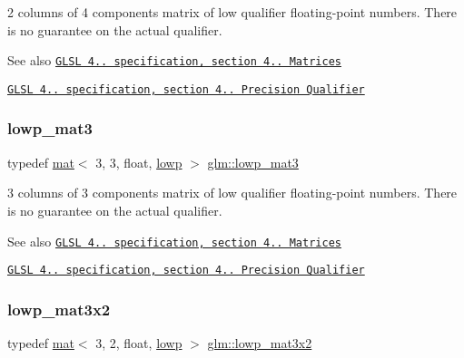 2 columns of 4 components matrix of low qualifier floating-\/point numbers. There is no guarantee on the actual qualifier.

\begin{DoxySeeAlso}{See also}
\href{http://www.opengl.org/registry/doc/GLSLangSpec.4.20.8.pdf}{\tt G\+L\+SL 4.. specification, section 4.. Matrices} 

\href{http://www.opengl.org/registry/doc/GLSLangSpec.4.20.8.pdf}{\tt G\+L\+SL 4.. specification, section 4.. Precision Qualifier} 
\end{DoxySeeAlso}
\mbox{\label{group__core__precision_ga8845e8da3db051cd798abc644850c6c2}} 
\subsubsection{\texorpdfstring{lowp\+\_\+mat3}{lowp\_mat3}}
{\footnotesize\ttfamily typedef \hyperlink{structglm_1_1mat}{mat}$<$ 3, 3, float, \hyperlink{namespaceglm_a36ed105b07c7746804d7fdc7cc90ff25ae161af3fc695e696ce3bf69f7332bc2d}{lowp} $>$ \hyperlink{group__core__precision_ga8845e8da3db051cd798abc644850c6c2}{glm\+::lowp\+\_\+mat3}}

3 columns of 3 components matrix of low qualifier floating-\/point numbers. There is no guarantee on the actual qualifier.

\begin{DoxySeeAlso}{See also}
\href{http://www.opengl.org/registry/doc/GLSLangSpec.4.20.8.pdf}{\tt G\+L\+SL 4.. specification, section 4.. Matrices} 

\href{http://www.opengl.org/registry/doc/GLSLangSpec.4.20.8.pdf}{\tt G\+L\+SL 4.. specification, section 4.. Precision Qualifier} 
\end{DoxySeeAlso}
\mbox{\label{group__core__precision_ga90265674cd36951273e63c70689d9a86}} 
\subsubsection{\texorpdfstring{lowp\+\_\+mat3x2}{lowp\_mat3x2}}
{\footnotesize\ttfamily typedef \hyperlink{structglm_1_1mat}{mat}$<$ 3, 2, float, \hyperlink{namespaceglm_a36ed105b07c7746804d7fdc7cc90ff25ae161af3fc695e696ce3bf69f7332bc2d}{lowp} $>$ \hyperlink{group__core__precision_ga90265674cd36951273e63c70689d9a86}{glm\+::lowp\+\_\+mat3x2}}

